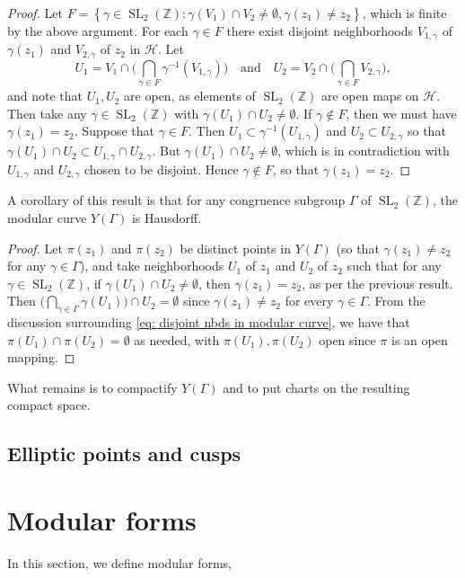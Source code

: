\documentclass[10pt,leqno]{article}
\theoremstyle{plain}
\theoremstyle{definition}
\numberwithin{equation}{section}
\numberwithin{lem}{section}
\newcommand{\cbr}[1]{\left\{#1\right\}}
\DeclareMathOperator{\SL}{SL}
\begin{document}
\begin{proof}
    Let $F = \cbr{\gamma\in \SL_2(\mathbb{Z}): \gamma(V_1)\cap V_2\neq \emptyset, \gamma(z_1)\neq z_2}$, which is finite by the above argument. For each $\gamma \in F$ there exist disjoint neighborhoods $V_{1,\gamma}$ of $\gamma(z_1)$ and $V_{2,\gamma}$ of $z_2$ in $\mathcal H$. Let \[U_1 = V_1\cap \Bigg(\bigcap_{\gamma\in F}\gamma^{-1}(V_{1,\gamma})\Bigg)\quad\text{and}\quad U_2 = V_2\cap \Bigg(\bigcap_{\gamma\in F}V_{2,\gamma}\Bigg),\] and note that $U_1,U_2$ are open, as elements of $\SL_2(\mathbb{Z})$ are open maps on $\mathcal H$. Then take any $\gamma\in \SL_2(\mathbb{Z})$ with $\gamma(U_1)\cap U_2\neq \emptyset$. If $\gamma\not\in F$, then we must have $\gamma(z_1) = z_2$. Suppose that $\gamma\in F$. Then $U_1\subset \gamma^{-1}(U_{1,\gamma})$ and $U_2\subset U_{2,\gamma}$ so that $ \gamma(U_1)\cap U_2\subset U_{1,\gamma}\cap U_{2,\gamma}$. But $\gamma(U_1)\cap U_2\neq \emptyset$, which is in contradiction with $U_{1,\gamma}$ and $U_{2,\gamma}$ chosen to be disjoint. Hence $\gamma\not\in F$, so that $\gamma(z_1)= z_2$.
\end{proof}

A corollary of this result is that for any congruence subgroup $\varGamma$ of $\SL_2(\mathbb{Z})$, the modular curve $Y(\varGamma)$ is Hausdorff. 
\begin{proof}
    Let $\pi(z_1)$ and $\pi(z_2)$ be distinct points in $Y(\varGamma)$ (so that $\gamma(z_1)\neq z_2$ for any $\gamma\in \varGamma$), and take neighborhoods $U_1$ of $z_1$ and $U_2$ of $z_2$ such that for any $\gamma\in \SL_2(\mathbb{Z})$, if $\gamma(U_1)\cap U_2\neq \emptyset$, then $\gamma(z_1) = z_2$, as per the previous result. Then $\big(\bigcap_{\gamma\in\varGamma}\gamma(U_1)\big)\cap U_2 = \emptyset$ since $\gamma(z_1)\neq z_2$ for every $\gamma\in \varGamma$. From the discussion surrounding \cref{eq: disjoint nbds in modular curve}, we have that $\pi(U_1)\cap\pi(U_2) = \emptyset$ as needed, with $\pi(U_1),\pi(U_2)$ open since $\pi$ is an open mapping.
\end{proof} 

What remains is to compactify $Y(\varGamma)$ and to put charts on the resulting compact space.


\subsection{Elliptic points and cusps}

\newpage\section{Modular forms}
In this section, we define modular forms, 
\end{document}
